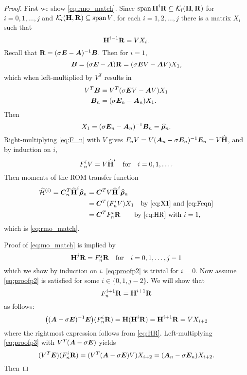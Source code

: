 \medskip
\begin{proof}
First we show \eqref{eq:rmo_match}.
Since $\operatorname*{span} \textbf{\textup{H}}^i \textbf{\textup{R}}\subseteq \mathcal{K}_{l}({\textbf{\textup{H}}},{\textbf{\textup{R}}})$ for $i=0,1,\ldots, j$ and  $\mathcal{K}_{l}({\textbf{\textup{H}}},{\textbf{\textup{R}}}) \subseteq \operatorname*{span} V$, for each $i=1,2,\ldots,j$ there is a matrix $X_i$ such that 
\begin{equation}
\textbf{\textup{H}}^{i-1} \textbf{\textup{R}} = V X_i.  
\label{eq:HR}
\end{equation}
Recall that  $\textbf{\textup{R}} = (\sigma \bm{E} - \bm{A})^{-1} \bm{B}$. Then for $i=1$, 
\[
\bm{B} = (\sigma \bm{E} - \bm{A})\textbf{\textup{R}} = (\sigma \bm{E} V - \bm{A} V)X_1,
\]
which when left-multiplied by $V^T$ results in
\begin{align*}
V^T \bm{B} &= V^T(\sigma \bm{E} V - \bm{A} V)X_1\\ 
\bm{B}_n &= (\sigma \bm{E}_n- \bm{A}_n)X_1.
\end{align*}
Then
\begin{equation}
X_1 = (\sigma \bm{E}_n- \bm{A}_n)^{-1}\bm{B}_n = \widehat{\boldsymbol{\rho}}_n.
\label{eq:X1}
\end{equation}
Right-multiplying \eqref{eq:F_n} with $V$ gives $F_n V =  V(\bm{A}_n-\sigma \bm{E}_n)^{-1}\bm{E}_n = V \widehat{\textbf{\textup{H}}}$, and by induction on $i$, 
\begin{equation}
F_n^i V =   V \widehat{\textbf{\textup{H}}}^i\quad\text{for}\quad i =0,1,\ldots .
\label{eq:Feqn}
\end{equation}
Then moments of the ROM transfer-function 
\begin{align*}
\widehat{\mathcal{H}}^{(i)} = \bm{C}_n^T \widehat{\textbf{\textup{H}}}^i \widehat{\boldsymbol{\rho}}_n 
&= \bm{C}^T V  \widehat{\textbf{\textup{H}}}^i \widehat{\boldsymbol{\rho}}_n \\
&= \bm{C}^T (F_n^i V) X_1 \quad \text{by \eqref{eq:X1} and \eqref{eq:Feqn}} \\
&= \bm{C}^T F_n^i \textbf{\textup{R}} \qquad \text{by \eqref{eq:HR} with } i=1,
\end{align*}
which is \eqref{eq:rmo_match}.

Proof of  \eqref{eq:mo_match} is implied by   
\begin{equation}
 \textbf{\textup{H}}^j \textbf{\textup{R}} = F^j_n \textbf{\textup{R}} \quad \text{for}\quad i=0,1,\ldots,j-1
\label{eq:proofp2}
\end{equation}
 which we show by induction on $i$.  \eqref{eq:proofp2} is trivial for $i=0$.  Now assume \eqref{eq:proofp2} is satisfied for some $i\in\{0,1,j-2\}$. We will show that 
\[
F^{i+1}_n \textbf{\textup{R}} = \textbf{\textup{H}}^{i+1}\textbf{\textup{R}}
\]
as follows:
\begin{equation}
\big( (\bm{A}-\sigma \bm{E})^{-1}\bm{E} \big)  (F_n^i \textbf{\textup{R}}) = \textbf{\textup{H}}(\textbf{\textup{H}}^i \textbf{\textup{R}}) = \textbf{\textup{H}}^{i+1} \textbf{\textup{R}}
 = V X_{i+2}
\label{eq:proofp3}
\end{equation}
where the rightmost expression follows from \eqref{eq:HR}. 
Left-multiplying \eqref{eq:proofp3} with $V^T(\bm{A}-\sigma \bm{E})$ yields
\begin{equation}
(V^T \bm{E})(F_n^i\textbf{\textup{R}}) = (V^T(\bm{A}-\sigma \bm{E})V)X_{i+2} = (\bm{A}_n - \sigma \bm{E}_n)X_{i+2}.
\label{eq:proofp4}
\end{equation}
Then 



\end{proof}
